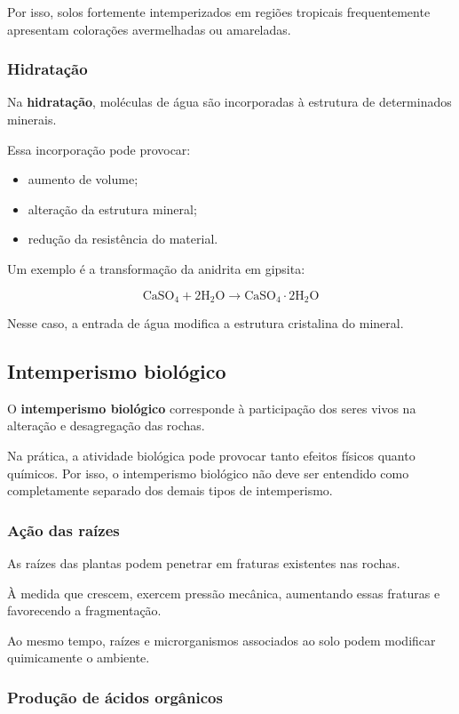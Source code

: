 \documentclass[a4paper,12pt]{article}
\theoremstyle{definition}
\theoremstyle{definition}
\theoremstyle{definition}
\begin{document}
Por isso, solos fortemente intemperizados em regiões tropicais frequentemente apresentam colorações avermelhadas ou amareladas.

\subsubsection{Hidratação}

Na \textbf{hidratação}, moléculas de água são incorporadas à estrutura de determinados minerais.

Essa incorporação pode provocar:

\begin{itemize}
    \item aumento de volume;
    \item alteração da estrutura mineral;
    \item redução da resistência do material.
\end{itemize}

Um exemplo é a transformação da anidrita em gipsita:

\[
\mathrm{CaSO_4 + 2H_2O
\rightarrow
CaSO_4\cdot 2H_2O}
\]

Nesse caso, a entrada de água modifica a estrutura cristalina do mineral.

\subsection{Intemperismo biológico}

O \textbf{intemperismo biológico} corresponde à participação dos seres vivos na alteração e desagregação das rochas.

Na prática, a atividade biológica pode provocar tanto efeitos físicos quanto químicos. Por isso, o intemperismo biológico não deve ser entendido como completamente separado dos demais tipos de intemperismo.

\subsubsection{Ação das raízes}

As raízes das plantas podem penetrar em fraturas existentes nas rochas.

À medida que crescem, exercem pressão mecânica, aumentando essas fraturas e favorecendo a fragmentação.

Ao mesmo tempo, raízes e microrganismos associados ao solo podem modificar quimicamente o ambiente.

\subsubsection{Produção de ácidos orgânicos}
\end{document}

